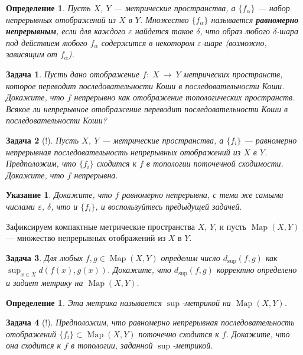 \documentclass[12pt]{book}
\newcommand{\arrow}{{\:\longrightarrow\:}}
\renewcommand{\epsilon}{\varepsilon}
\def\Map{\operatorname{Map}}
\theoremstyle{upshape}
\newtheorem{zadacha}{Задача}[chapter]
\theoremstyle{generic}
\newtheorem{opredelenie}[teorema]{Определение}
\theoremstyle{upshapenonumber}
\newtheorem{ukazanie}{Указание}[section]
\newcommand{\следствие}{%
     \refstepcounter{teorema}
     {\noindent\bf Следствие \thechapter.\arabic{teorema}:\ }}
\newcommand{\пример}{%
     \refstepcounter{teorema}
     {\noindent\bf Пример \thechapter.\arabic{teorema}:\ }}
\newcommand{\лемма}{%
     \refstepcounter{teorema}
     {\noindent\bf Лемма \thechapter.\arabic{teorema}:\ }}
\newcommand{\теорема}{%
     \refstepcounter{teorema}
     {\noindent\bf Теорема \thechapter.\arabic{teorema}:\ }}
\newcommand{\утверждение}{%
     \refstepcounter{teorema}
     {\noindent\bf Утверждение \thechapter.\arabic{teorema}:\ }}
\begin{document}
{\begin{opredelenie}
Пусть $X$, $Y$ --- метрические пространства,
а $\{f_\alpha\}$ --- набор непрерывных отображений
из $X$ в $Y$. Множество $\{f_\alpha\}$ называется
{\bf равномерно непрерывным}, если 
для каждого $\epsilon$ найдется такое $\delta$, 
что образ любого $\delta$-шара
под действием любого $f_\alpha$ содержится
в некотором $\epsilon$-шаре (возможно, зависящим от $f_\alpha$).
\end{opredelenie}

\begin{zadacha}
Пусть дано отображение $f:\; X \arrow Y$ 
метрических пространств,
которое переводит последовательности Коши в
последовательности Коши. Докажите, что 
$f$ непрерывно как отображение топологических
пространств. Всякое ли непрерывное
отображение переводит последовательности Коши в
последовательности Коши?
\end{zadacha}

\begin{zadacha}[!]
Пусть $X$, $Y$ --- метрические пространства,
а $\{f_i\}$ --- равномерно непрерывная
последовательность непрерывных отображений
из $X$ в $Y$. Предположим, что $\{f_i\}$ 
сходится к $f$ в топологии поточечной
сходимости. Докажите, что $f$ непрерывна.
\end{zadacha}

\begin{ukazanie} 
Докажите, что $f$ равномерно непрерывна,
с теми же самыми числами $\epsilon$, $\delta$,
что и $\{f_i\}$, и воспользуйтесь предыдущей задачей.
\end{ukazanie}

Зафиксируем компактные метрические пространства $X$, $Y$, 
и пусть $\Map(X,Y)$ --- множество непрерывных отображений 
из $X$ в $Y$. 

\begin{zadacha} 
Для любых $f, g\in \Map(X,Y)$ определим число $d_{\sup}(f,g)$
как $\sup_{x\in X} d(f(x), g(x))$. Докажите,
что $d_{\sup}(f,g)$ корректно определено и задает
метрику на $\Map(X,Y)$.
\end{zadacha}

\begin{opredelenie}
Эта метрика называется $\sup$-метрикой на
$\Map(X,Y)$.
\end{opredelenie}

\begin{zadacha}[!]
Предположим, что равномерно непрерывная 
последовательность отображений $\{f_i\}\subset \Map(X,Y)$ поточечно 
сходится к $f$. Докажите, что она сходится к $f$
в топологии, заданной $\sup$-метрикой.
\end{zadacha}

}
\end{document}
